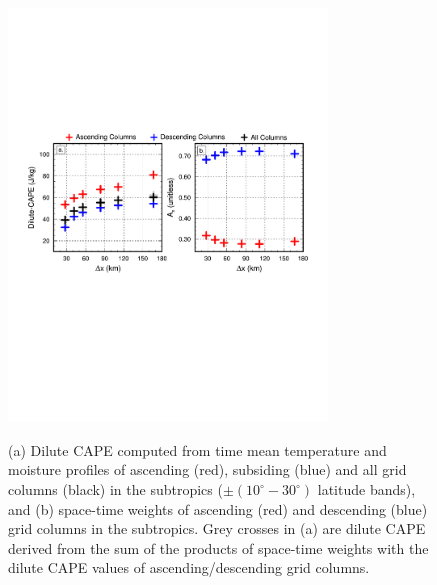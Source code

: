 \documentclass[times]{qjrms4}
\begin{document}
\begin{figure}
\begin{center}
\noindent\includegraphics[width=20pc,angle=0]{figs/temp_cape-subtropics.pdf}\\
\end{center}
\caption{(a) Dilute CAPE computed from time mean temperature and moisture profiles of ascending (red), subsiding (blue) and all grid columns (black) in the subtropics ($\pm \left(10^{\circ}-30^{\circ} \right)$ latitude bands), and (b) space-time weights of ascending (red) and descending (blue) grid columns in the subtropics. Grey crosses in (a) are dilute CAPE derived from the sum of the products of space-time weights with the dilute CAPE values of ascending/descending grid columns.}
\label{fig:cape-subt}
\end{figure}
\end{document}
